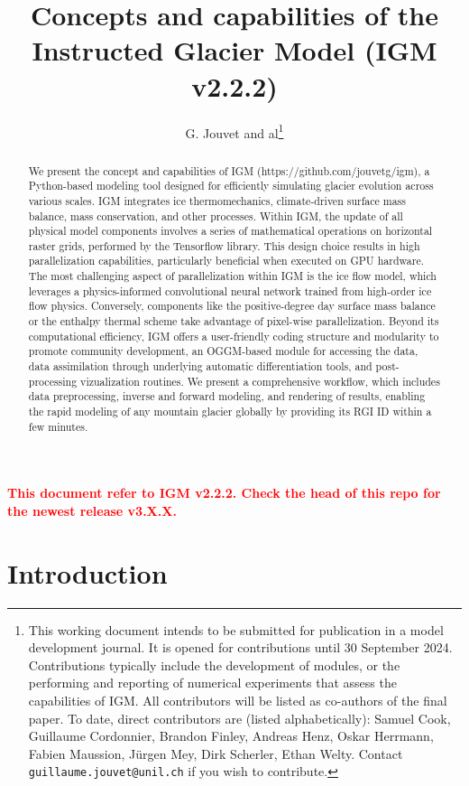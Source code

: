 \documentclass[10pt,twocolumn]{article}
\author{G. Jouvet and al\footnote{This working document intends to be submitted for publication in a model development journal. It is opened for contributions until 30 September 2024. Contributions typically include the development of modules, or the performing and reporting of numerical experiments that assess the capabilities of IGM. All contributors will be listed as co-authors of the final paper. To date, direct contributors are (listed alphabetically): Samuel Cook, Guillaume Cordonnier, Brandon Finley, Andreas Henz, Oskar Herrmann, Fabien Maussion, Jürgen Mey, Dirk Scherler, Ethan Welty. Contact \texttt{guillaume.jouvet@unil.ch} if you wish to contribute.}}
\begin{document}
\allowdisplaybreaks 


\title{Concepts and capabilities of the Instructed Glacier Model (IGM v2.2.2)}

\maketitle
 
{\textbf{\textcolor{red}{This document refer to IGM v2.2.2. Check the head of this repo for the newest release v3.X.X. }}}

\begin{abstract}
We present the concept and capabilities of IGM (https://github.com/jouvetg/igm), 
a Python-based modeling tool designed for efficiently simulating glacier evolution 
across various scales. IGM integrates ice thermomechanics, climate-driven surface 
mass balance, mass conservation, and other processes. Within IGM, the update of all physical 
model components involves a series of mathematical operations on horizontal raster grids, 
performed by the Tensorflow library. This design choice results in high parallelization 
capabilities, particularly beneficial when executed on GPU hardware. 
The most challenging aspect of parallelization within IGM is the ice flow model, 
which leverages a physics-informed convolutional neural network trained from 
high-order ice flow physics. Conversely, components like the 
positive-degree day surface mass balance or the enthalpy thermal scheme 
take advantage of pixel-wise parallelization. Beyond its computational efficiency, 
IGM offers a user-friendly coding structure and modularity to promote community 
development, an OGGM-based module for accessing the data, data assimilation through 
underlying automatic differentiation tools, and post-processing vizualization routines. 
We present a comprehensive workflow, which includes data preprocessing, 
inverse and forward modeling, and rendering of results, enabling the rapid modeling 
of any mountain glacier globally by providing its RGI ID within a few minutes. 
\end{abstract}

\section{Introduction} 
\end{document}
